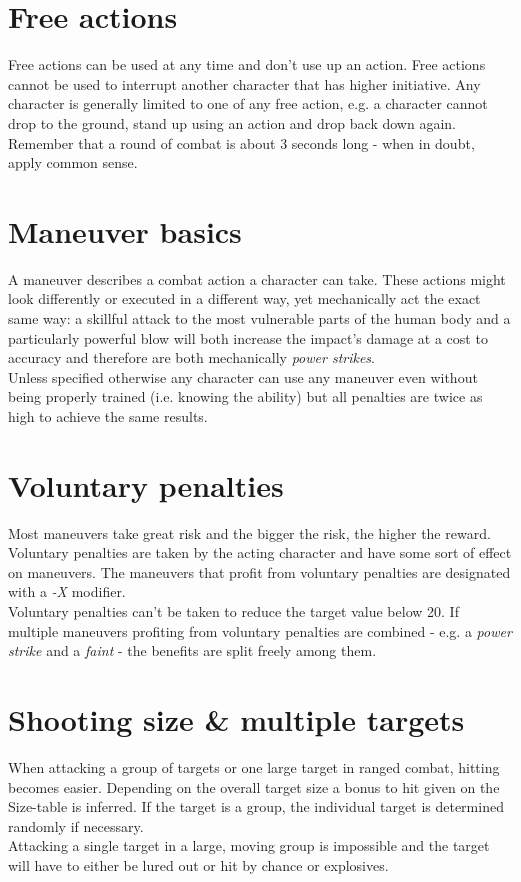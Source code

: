 \section{Free actions}
Free actions can be used at any time and don't use up an action. Free actions cannot be used to interrupt another character that has higher initiative. Any character is generally limited to one of any free action, e.g. a character cannot drop to the ground, stand up using an action and drop back down again. Remember that a round of combat is about 3 seconds long - when in doubt, apply common sense.
\section{Maneuver basics}
A maneuver describes a combat action a character can take. These actions might look differently or executed in a different way, yet mechanically act the exact same way: a skillful attack to the most vulnerable parts of the human body and a particularly powerful blow will both increase the impact’s damage at a cost to accuracy and therefore are both mechanically \textit{power strikes}.\\
Unless specified otherwise any character can use any maneuver even without being properly trained (i.e. knowing the ability) but all penalties are twice as high to achieve the same results.
\section{Voluntary penalties}
Most maneuvers take great risk and the bigger the risk, the higher the reward. Voluntary penalties are taken by the acting character and have some sort of effect on maneuvers. The maneuvers that profit from voluntary penalties are designated with a \emph{-X} modifier.\\
Voluntary penalties can’t be taken to reduce the target value below 20. If multiple maneuvers profiting from voluntary penalties are combined - e.g. a \emph{power strike} and a \emph{faint} - the benefits are split freely among them.
\section{Shooting size \& multiple targets}
When attacking a group of targets or one large target in ranged combat, hitting becomes easier. Depending on the overall target size a bonus to hit given on the Size-table is inferred. If the target is a group, the individual target is determined randomly if necessary.\\
Attacking a single target in a large, moving group is impossible and the target will have to either be lured out or hit by chance or explosives.
